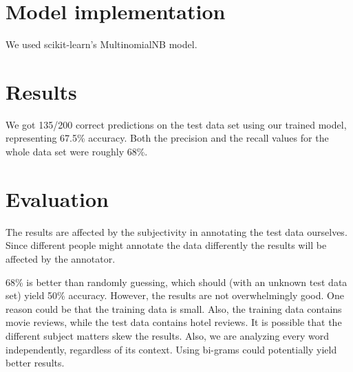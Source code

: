 \documentclass[a4paper,10pt]{article}
\begin{document}
\section{Model implementation}
We used scikit-learn's MultinomialNB model.

\section{Results}
We got 135/200 correct predictions on the test data set using our trained model, representing 67.5\% accuracy. Both the precision and the recall values for the whole data set were roughly 68\%.

\section{Evaluation}
The results are affected by the subjectivity in annotating the test data ourselves. Since different people might annotate the data differently the results will be affected by the annotator. 

68\% is better than randomly guessing, which should (with an unknown test data set) yield 50\% accuracy. However, the results are not overwhelmingly good. One reason could be that the training data is small. Also, the training data contains movie reviews, while the test data contains hotel reviews. It is possible that the different subject matters skew the results. Also, we are analyzing every word independently, regardless of its context. Using bi-grams could potentially yield better results.
	
\end{document}
